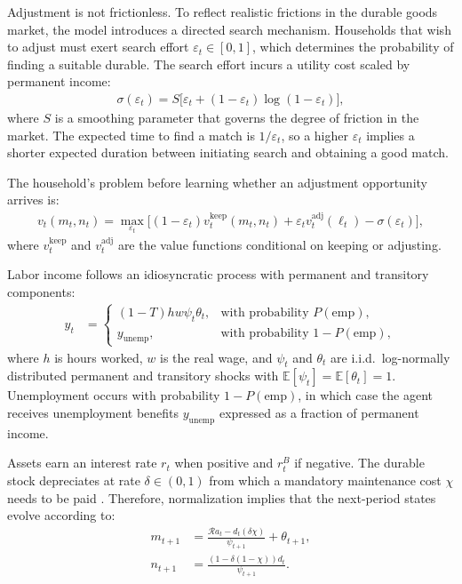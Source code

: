 Adjustment is not frictionless. To reflect realistic frictions in the durable goods market, the model introduces a directed search mechanism. Households that wish to adjust must exert search effort $\varepsilon_t \in [0,1]$, which determines the probability of finding a suitable durable. The search effort incurs a utility cost scaled by permanent income:
\begin{align}
	\sigma(\varepsilon_t) = S\big[\varepsilon_t + (1-\varepsilon_t)\log(1-\varepsilon_t)\big],
\end{align}
where $S$ is a smoothing parameter that governs the degree of friction in the market. The expected time to find a match is $1/\varepsilon_t$, so a higher $\varepsilon_t$ implies a shorter expected duration between initiating search and obtaining a good match.  

The household's problem before learning whether an adjustment opportunity arrives is:
\begin{align}
	v_t(m_t,n_t) = \max_{\varepsilon_t} \Big[(1-\varepsilon_t) v_t^{\text{keep}}(m_t,n_t) + \varepsilon_t v_t^{\text{adj}}(\ell_t) - \sigma(\varepsilon_t)\Big],
\end{align}
where $v_t^{\text{keep}}$ and $v_t^{\text{adj}}$ are the value functions conditional on keeping or adjusting.

Labor income follows an idiosyncratic process with permanent and transitory components:
\begin{align}
	y_t &=
	\begin{cases}
		(1-T) h w \psi_t \theta_t, & \text{with probability } P(\text{emp}),\\
		y_{\text{unemp}}, & \text{with probability } 1 - P(\text{emp}),
	\end{cases}
\end{align}
where $h$ is hours worked, $w$ is the real wage, and $\psi_t$ and $\theta_t$ are i.i.d.\ log-normally distributed permanent and transitory shocks with $\mathbb{E}[\psi_t] = \mathbb{E}[\theta_t] = 1$. Unemployment occurs with probability $1-P(\text{emp})$, in which case the agent receives unemployment benefits $y_{\text{unemp}}$ expressed as a fraction of permanent income. 

Assets earn an interest rate $r_t$ when positive and $r_t^B$ if negative. The durable stock depreciates at rate $\delta \in (0,1)$ from which a mandatory maintenance cost $\chi$ needs to be paid \cite{Bachmann2013-ka}. Therefore, normalization implies that the next-period states evolve according to:
\begin{align}
	m_{t+1} &= \frac{\mathcal{R} a_t - d_t (\delta \chi)}{\psi_{t+1}} + \theta_{t+1},\\
	n_{t+1} &= \frac{(1-\delta(1 - \chi))d_t}{\psi_{t+1}}.
\end{align}

